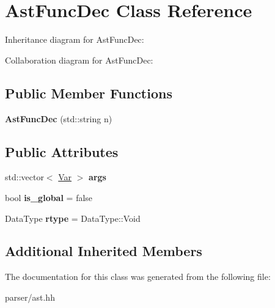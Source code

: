 \hypertarget{classAstFuncDec}{}\section{Ast\+Func\+Dec Class Reference}
\label{classAstFuncDec}


Inheritance diagram for Ast\+Func\+Dec\+:


Collaboration diagram for Ast\+Func\+Dec\+:
\subsection*{Public Member Functions}
\begin{DoxyCompactItemize}
\item 
\mbox{\label{classAstFuncDec_abb45cbf5a605dd3feb6bdd34d155e75a}} 
{\bfseries Ast\+Func\+Dec} (std\+::string n)
\end{DoxyCompactItemize}
\subsection*{Public Attributes}
\begin{DoxyCompactItemize}
\item 
\mbox{\label{classAstFuncDec_a8fb9676cfb5ef7de03e8eee4fffb6ad7}} 
std\+::vector$<$ \hyperlink{structVar}{Var} $>$ {\bfseries args}
\item 
\mbox{\label{classAstFuncDec_a4bfc4b23a6e6ef0ea9dd5483c39b9bcb}} 
bool {\bfseries is\+\_\+global} = false
\item 
\mbox{\label{classAstFuncDec_ac1fd8c5dd8ff9d6fe24bfdf9af37c8b5}} 
Data\+Type {\bfseries rtype} = Data\+Type\+::\+Void
\end{DoxyCompactItemize}
\subsection*{Additional Inherited Members}


The documentation for this class was generated from the following file\+:\begin{DoxyCompactItemize}
\item 
parser/ast.\+hh\end{DoxyCompactItemize}
